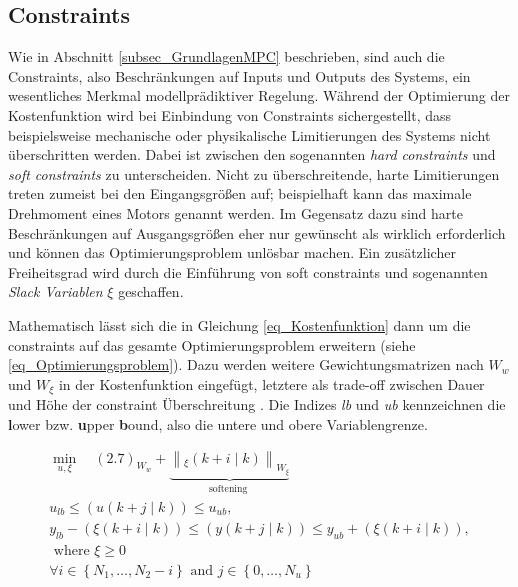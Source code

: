 \subsection{Constraints} \label{subsec_Constraints}
Wie in Abschnitt \ref{subsec_GrundlagenMPC} beschrieben, sind auch die Constraints, also Beschränkungen auf Inputs und Outputs des Systems, ein wesentliches Merkmal modellprädiktiver Regelung.
Während der Optimierung der Kostenfunktion wird bei Einbindung von Constraints sichergestellt, dass beispielsweise mechanische oder physikalische Limitierungen des Systems nicht überschritten werden.
Dabei ist zwischen den sogenannten \textit{hard constraints} und \textit{soft constraints} zu unterscheiden.
Nicht zu überschreitende, harte Limitierungen treten zumeist bei den Eingangsgrößen auf; beispielhaft kann das maximale Drehmoment eines Motors genannt werden.
Im Gegensatz dazu sind harte Beschränkungen auf Ausgangsgrößen eher nur gewünscht als wirklich erforderlich und können das Optimierungsproblem unlösbar machen.
Ein zusätzlicher Freiheitsgrad wird durch die Einführung von soft constraints und sogenannten \textit{Slack Variablen} $\xi$ geschaffen. \cite[S.4]{Schwenzer}

Mathematisch lässt sich die in Gleichung \ref{eq_Kostenfunktion} dann um die constraints auf das gesamte Optimierungsproblem erweitern (siehe \ref{eq_Optimierungsproblem}).
Dazu werden weitere Gewichtungsmatrizen nach \cite[S.4]{Schwenzer}$W_w$ und $W_\xi$ in der Kostenfunktion eingefügt, letztere als trade-off zwischen Dauer und Höhe der constraint Überschreitung \cite{Rawlings}.
Die Indizes \textit{lb} und \textit{ub} kennzeichnen die \textbf{l}ower bzw. \textbf{u}pper \textbf{b}ound, also die untere und obere Variablengrenze.

\begin{equation} \label{eq_Optimierungsproblem}
\begin{gathered}
    \min_{u, \xi} \quad (2.7)_{W_w}+\underbrace{\left\|_{\xi}(k+i \mid k)\right\|_{W_{\xi}}}_{\text {softening }} \qquad\\
    u_{l b} \leq(u(k+j \mid k)) \leq u_{u b}, \\
    y_{l b}-(\xi(k+i \mid k)) \leq(y(k+j \mid k)) \leq y_{u b}+(\xi(k+i \mid k)), \\
    \text { where } \xi \geq 0 \\
    \forall i \in\left\{N_1, \ldots, N_2-i\right\} \text { and } j \in\left\{0, \ldots, N_u\right\}
\end{gathered}
\end{equation}

